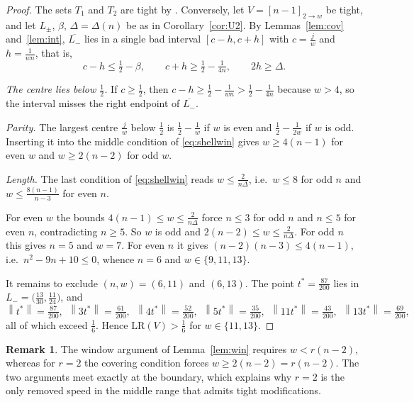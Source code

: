 \documentclass[11pt]{article}
\theoremstyle{definition}
\newtheorem{remark}[theorem]{Remark}
\newcommand{\LR}{\mathrm{LR}}
\newcommand{\norm}[1]{\left\lVert #1 \right\rVert}
\begin{document}
\begin{proof}
The sets $T_1$ and $T_2$ are tight by \cite{Wills1968}. Conversely, let
$V=[n-1]_{2\to w}$ be tight, and let $L_\pm$, $\beta$, $\Delta=\Delta(n)$
be as in Corollary~\ref{cor:U2}. By Lemmas~\ref{lem:cov}
and~\ref{lem:int}, $\overline{L_-}$ lies in a single bad interval
$[c-h,c+h]$ with $c=\frac jw$ and $h=\frac1{wn}$, that is,
\begin{equation}\label{eq:shellwin}
c-h\le\tfrac12-\beta,\qquad c+h\ge\tfrac12-\tfrac1{4n},\qquad
2h\ge\Delta .
\end{equation}

\emph{The centre lies below $\frac12$.} If $c\ge\frac12$, then
$c-h\ge\frac12-\frac1{wn}>\frac12-\frac1{4n}$ because $w>4$, so the
interval misses the right endpoint of $\overline{L_-}$.

\emph{Parity.} The largest centre $\frac jw$ below $\frac12$ is
$\frac12-\frac1w$ if $w$ is even and $\frac12-\frac1{2w}$ if $w$ is odd.
Inserting it into the middle condition of \eqref{eq:shellwin} gives
$w\ge4(n-1)$ for even $w$ and $w\ge2(n-2)$ for odd $w$.

\emph{Length.} The last condition of \eqref{eq:shellwin} reads
$w\le\frac2{n\Delta}$, i.e.\ $w\le8$ for odd $n$ and
$w\le\frac{8(n-1)}{n-3}$ for even $n$.

For even $w$ the bounds $4(n-1)\le w\le\frac2{n\Delta}$ force $n\le3$
for odd $n$ and $n\le5$ for even $n$, contradicting $n\ge5$. So $w$ is
odd and $2(n-2)\le w\le\frac2{n\Delta}$. For odd $n$ this gives $n=5$
and $w=7$. For even $n$ it gives $(n-2)(n-3)\le4(n-1)$, i.e.\
$n^2-9n+10\le0$, whence $n=6$ and $w\in\{9,11,13\}$.

It remains to exclude $(n,w)=(6,11)$ and $(6,13)$. The point
$t^*=\frac{87}{200}$ lies in
$L_-=\bigl(\frac{13}{30},\frac{11}{24}\bigr)$, and
\[
\norm{t^*}=\tfrac{87}{200},\ \ \norm{3t^*}=\tfrac{61}{200},\ \
\norm{4t^*}=\tfrac{52}{200},\ \ \norm{5t^*}=\tfrac{35}{200},\ \
\norm{11t^*}=\tfrac{43}{200},\ \ \norm{13t^*}=\tfrac{69}{200},
\]
all of which exceed $\frac16$. Hence $\LR(V)>\frac16$ for
$w\in\{11,13\}$.
\end{proof}

\begin{remark}\label{rem:r2boundary}
The window argument of Lemma~\ref{lem:win} requires $w<r(n-2)$, whereas
for $r=2$ the covering condition forces $w\ge2(n-2)=r(n-2)$. The two
arguments meet exactly at the boundary, which explains why $r=2$ is the
only removed speed in the middle range that admits tight modifications.
\end{remark}
\end{document}
